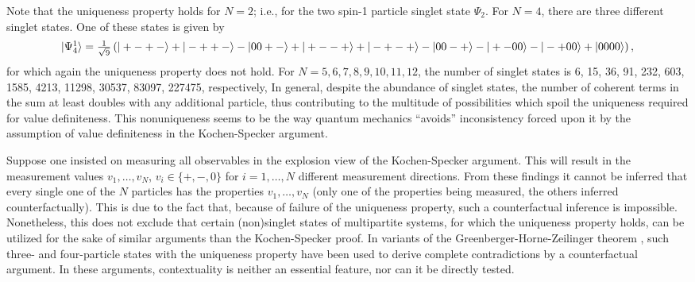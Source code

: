 \documentclass[prl,twocolumn,showpacs,showkeys,amsfonts]{revtex4}
\begin{document}
Note that the uniqueness property holds for $N=2$; i.e., for  the two spin-1 particle
singlet state $\Psi_2$.
For $N=4$, there are three different singlet states.
One of these states is given by
\begin{equation}
\begin{array}{l}
\vert \Psi_4^1 \rangle
= {1\over \sqrt{9}}\left(
\vert +-+- \rangle
+
\vert -++- \rangle
-
\vert 00+-\rangle
+
\vert +--+\rangle
+
\vert -+-+\rangle
-
\vert 00-+\rangle
-
\vert +-00\rangle
-
\vert -+00\rangle
+
\vert 0000\rangle
\right),
\label{2004-qnc-e12}
\end{array}
\end{equation}
for which again the uniqueness property does not hold.
For
$N=5,6,7,8,9,10,11,12$, the number of singlet states is
6, 15, 36, 91, 232, 603, 1585, 4213, 11298, 30537, 83097, 227475, respectively,
In general, despite the abundance of singlet states,
the number of coherent terms in the sum at least doubles
with any additional particle, thus contributing to the multitude of
possibilities which spoil the uniqueness required for value definiteness.
This nonuniqueness seems to be the way quantum mechanics ``avoids''
inconsistency forced upon it by the assumption  of value definiteness
in the Kochen-Specker argument.




Suppose one insisted on measuring all observables in the explosion view of the Kochen-Specker argument.
This will result in the measurement values
$v_1,\ldots , v_N$, $v_i\in \{+,-,0\}$ for $i=1, \ldots ,N$ different measurement directions.
From these findings it cannot be inferred that every single one of the $N$ particles
has the properties $v_1,\ldots , v_N$ (only one of the properties being measured, the others
inferred counterfactually). This is due to the fact that,
because of failure of the uniqueness property, such a counterfactual inference is impossible.
Nonetheless, this does not exclude that certain (non)singlet states of multipartite systems,
for which the uniqueness property holds,
can be utilized for the sake of similar arguments than the Kochen-Specker proof.
In variants of the Greenberger-Horne-Zeilinger theorem
\cite{ghz,ghsz,mermin90b}, such three- and four-particle
states with the uniqueness property have been used to derive
complete contradictions by a counterfactual argument.
In these arguments, contextuality is neither an essential feature, nor can it be directly tested.
\end{document}
